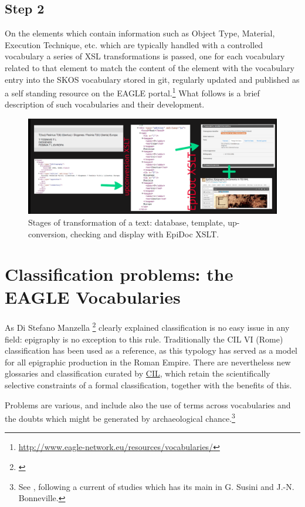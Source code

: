 \documentclass[amsthm,ebook]{saparticle}
\begin{document}
\subsection{Step 2}
\noindent On the elements which contain information such as Object Type, Material, Execution Technique, etc. which are typically handled with a controlled vocabulary a series of XSL transformations is passed, one for each vocabulary related to that element  to match the content of the element with the vocabulary entry into the SKOS vocabulary stored in git, regularly updated and published as a self standing resource on the EAGLE portal.\footnote{\url{http://www.eagle-network.eu/resources/vocabularies/}} What follows is a brief description of such vocabularies and their development.

\begin{figure}[htbp] \includegraphics[width=\columnwidth]{upconversion.png} \caption[]{Stages of transformation of a text: database, template, up-conversion, checking and display with EpiDoc XSLT.} \end{figure}

\section{Classification problems: the EAGLE Vocabularies}
As Di Stefano Manzella \footnote{\citet[109]{Manzella1987}} clearly explained classification is no easy issue in any field: epigraphy is no exception to this rule. Traditionally the CIL VI (Rome) classification has been used as a reference, as this typology has served as a model for all epigraphic production in the Roman Empire. There are nevertheless new glossaries and classification curated by \href{http://cil.bbaw.de/cil_en/dateien/glossar.php#auswahlglossar}{CIL}, which retain the scientifically selective constraints of a formal classification, together with the benefits of this.

Problems are various, and include also the use of terms across vocabularies and the doubts which might be generated by archaeological chance.\footnote{ See \citet[XI-XII]{Piso}, following a current of studies which has its main in G. Susini and J.-N. Bonneville.}
\end{document}
